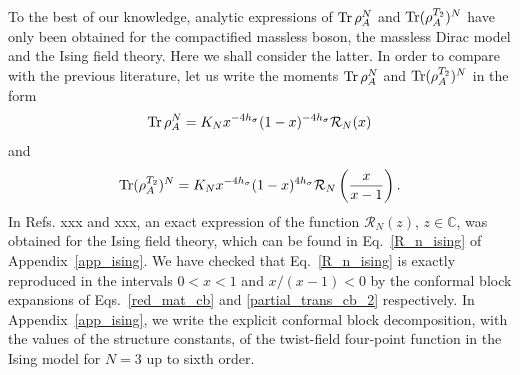 \documentclass[a4paper,11pt]{article}
\def\Tr{\mathop{\mbox{\normalfont Tr}}\nolimits}
\begin{document}
To the best of our knowledge, analytic expressions of $\Tr\rho_A^N$ and $\Tr(\rho_A^{T_2})^N$ have  
only been obtained for the compactified massless boson, the massless Dirac 
model and the Ising field theory. Here we shall consider the latter. In order 
to compare with the previous literature, let us write the moments $\Tr\rho_A^N$ 
and $\Tr(\rho_A^{T_2})^N$ in the form
\begin{equation}\label{F_n_cc}
\Tr\rho_A^N=K_Nx^{-4h_\sigma}(1-x)^{-4h_\sigma}\mathcal{R}_N(x)
\end{equation}
and 
\begin{equation}\label{G_n_cc}
 \Tr(\rho_A^{T_2})^N=K_N x^{-4h_\sigma}(1-x)^{4h_\sigma}\mathcal{R}_N\left(\frac{x}{x-1}\right).
\end{equation}
In Refs. xxx and xxx, an exact expression of the function
$\mathcal{R}_N(z)$, $z\in\mathbb{C}$, was obtained for the Ising field theory, 
which can be found in Eq.~\eqref{R_n_ising} of Appendix~\ref{app_ising}. 
We have checked that Eq.~\eqref{R_n_ising} is exactly reproduced in the intervals $0<x<1$ and $x/(x-1)<0$ by the 
conformal block expansions of Eqs.~\eqref{red_mat_cb} and \eqref{partial_trans_cb_2} 
respectively. In Appendix~\ref{app_ising}, we write the explicit 
conformal block decomposition, with the values of the structure constants, 
of the twist-field four-point function in the Ising model for $N=3$ up to sixth order. 
\end{document}

